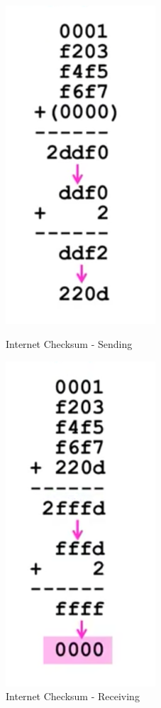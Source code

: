 \documentclass[12pt]{ctexart}   %
\begin{document}
\begin{itemize}
		\begin{figure}
			\begin{minipage}[t]{0.5\linewidth}
				\centering
				\includegraphics[width=2.2in]{images/2-9-3}
				\caption{Internet Checksum - Sending}
				\label{fig:2-9-3}
			\end{minipage}
			\begin{minipage}[t]{0.5\linewidth}
				\centering
				\includegraphics[width=2.2in]{images/2-9-4}
				\caption{Internet Checksum - Receiving}
				\label{fig:2-9-4}
			\end{minipage}
		\end{figure}
		

\end{itemize}
\end{document}
